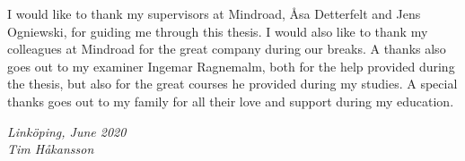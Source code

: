 \begin{acknowledgments}
  I would like to thank my supervisors at Mindroad, Åsa Detterfelt and Jens Ogniewski, for guiding me through this thesis. I would also like to thank my colleagues at Mindroad for the great company during our breaks. A thanks also goes out to my examiner Ingemar Ragnemalm, both for the help provided during the thesis, but also for the great courses he provided during my studies. A special thanks goes out to my family for all their love and support during my education.

  \addvspace{1em}
  \begin{flushright}
    \textit{%
      Linköping, June 2020\\
      Tim Håkansson%
    }
  \end{flushright}
\end{acknowledgments}
